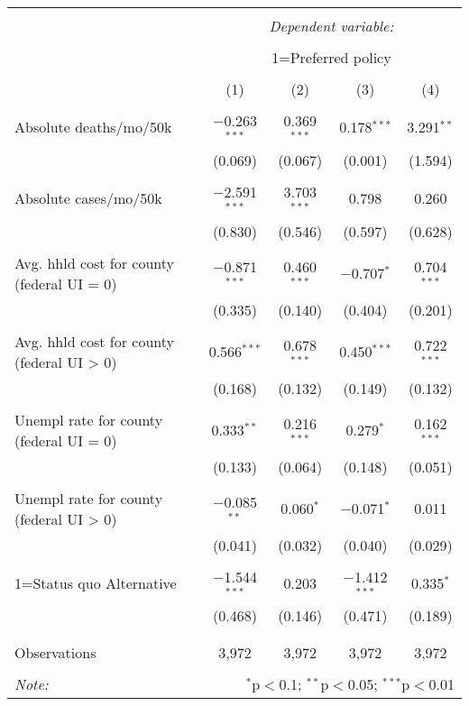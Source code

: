 
\begin{table}[!htbp] \centering 
  \caption{} 
  \label{} 
\begin{tabular}{@{\extracolsep{5pt}}lcccc} 
\\[-1.8ex]\hline 
\hline \\[-1.8ex] 
 & \multicolumn{4}{c}{\textit{Dependent variable:}} \\ 
\cline{2-5} 
\\[-1.8ex] & \multicolumn{4}{c}{1=Preferred policy} \\ 
\\[-1.8ex] & (1) & (2) & (3) & (4)\\ 
\hline \\[-1.8ex] 
 Absolute deaths/mo/50k & $-$0.263$^{***}$ & 0.369$^{***}$ & 0.178$^{***}$ & 3.291$^{**}$ \\ 
  & (0.069) & (0.067) & (0.001) & (1.594) \\ 
  & & & & \\ 
 Absolute cases/mo/50k & $-$2.591$^{***}$ & 3.703$^{***}$ & 0.798 & 0.260 \\ 
  & (0.830) & (0.546) & (0.597) & (0.628) \\ 
  & & & & \\ 
 Avg. hhld cost for county (federal UI = 0) & $-$0.871$^{***}$ & 0.460$^{***}$ & $-$0.707$^{*}$ & 0.704$^{***}$ \\ 
  & (0.335) & (0.140) & (0.404) & (0.201) \\ 
  & & & & \\ 
 Avg. hhld cost for county (federal UI > 0) & 0.566$^{***}$ & 0.678$^{***}$ & 0.450$^{***}$ & 0.722$^{***}$ \\ 
  & (0.168) & (0.132) & (0.149) & (0.132) \\ 
  & & & & \\ 
 Unempl rate for county (federal UI = 0) & 0.333$^{**}$ & 0.216$^{***}$ & 0.279$^{*}$ & 0.162$^{***}$ \\ 
  & (0.133) & (0.064) & (0.148) & (0.051) \\ 
  & & & & \\ 
 Unempl rate for county (federal UI > 0) & $-$0.085$^{**}$ & 0.060$^{*}$ & $-$0.071$^{*}$ & 0.011 \\ 
  & (0.041) & (0.032) & (0.040) & (0.029) \\ 
  & & & & \\ 
 1=Status quo Alternative & $-$1.544$^{***}$ & 0.203 & $-$1.412$^{***}$ & 0.335$^{*}$ \\ 
  & (0.468) & (0.146) & (0.471) & (0.189) \\ 
  & & & & \\ 
\hline \\[-1.8ex] 
Observations & 3,972 & 3,972 & 3,972 & 3,972 \\ 
\hline 
\hline \\[-1.8ex] 
\textit{Note:}  & \multicolumn{4}{r}{$^{*}$p$<$0.1; $^{**}$p$<$0.05; $^{***}$p$<$0.01} \\ 
\end{tabular} 
\end{table} 

